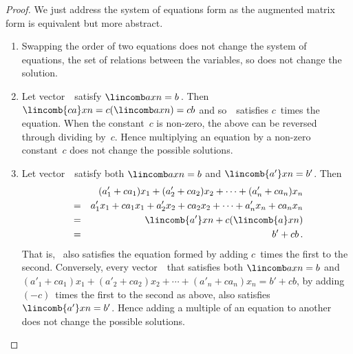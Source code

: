 \begin{proof} 
We just address the system of equations form as the augmented matrix form is equivalent but more abstract.
\begin{enumerate}
\item Swapping the order of two equations does not change the system of equations, the set of relations between the variables, so does not change the solution.
\item Let vector~\xv\ satisfy \(\lincomb axn=b\)\,.
Then \(\lincomb{ca}xn=c(\lincomb axn)=cb\) and so~\xv\ satisfies \(c\)~times the equation.
When the constant~\(c\) is non-zero, the above can be reversed through dividing by~\(c\).
Hence multiplying an equation by a non-zero constant~\(c\) does not change the possible solutions.
\item 
Let vector~\xv\ satisfy both \(\lincomb axn=b\) and \(\lincomb{a'}xn=b'\).
Then
\begin{eqnarray*}
&&(a'_1+ca_1)x_1+(a'_2+ca_2)x_2+\cdots+(a'_n+ca_n)x_n
\\&=&a'_1x_1+ca_1x_1+a'_2x_2+ca_2x_2+\cdots+a'_nx_n+ca_nx_n
\\&=&\lincomb{a'}xn +c(\lincomb{a}xn)
\\&=&b'+cb\,.
\end{eqnarray*}
That is, \xv~also satisfies the equation formed by adding \(c\)~times the first to the second.
Conversely, every vector~\xv\ that satisfies both \(\lincomb axn=b\) and \((a'_1+ca_1)x_1+(a'_2+ca_2)x_2+\cdots+(a'_n+ca_n)x_n=b'+cb\), by adding \((-c)\)~times the first to the second as above, also satisfies \(\lincomb{a'}xn=b'\).
Hence adding a multiple of an equation to another does not change the possible solutions.
\end{enumerate}
\end{proof}



